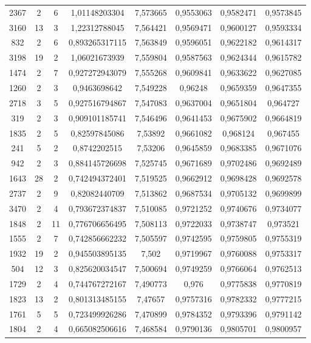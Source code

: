 \begin{longtable}{|c|c|c|c|c|c|c|c|}
2367 & 2 & 6 & 1,01148203304 & 7,573665 & 0,9553063 & 0,9582471 & 0,9573845 \\
3160 & 13 & 3 & 1,22312788045 & 7,564421 & 0,9569471 & 0,9600127 & 0,9593334 \\
832 & 2 & 6 & 0,893265317115 & 7,563849 & 0,9596051 & 0,9622182 & 0,9614317 \\
3198 & 19 & 2 & 1,06021673939 & 7,559804 & 0,9587563 & 0,9624344 & 0,9615782 \\
1474 & 2 & 7 & 0,927272943079 & 7,555268 & 0,9609841 & 0,9633622 & 0,9627085 \\
1260 & 2 & 3 & 0,9463698642 & 7,549228 & 0,96248 & 0,9659359 & 0,9647355 \\
2718 & 3 & 5 & 0,927516794867 & 7,547083 & 0,9637004 & 0,9651804 & 0,964727 \\
319 & 2 & 3 & 0,909101185741 & 7,546496 & 0,9641453 & 0,9675902 & 0,9664819 \\
1835 & 2 & 5 & 0,82597845086 & 7,53892 & 0,9661082 & 0,968124 & 0,967455 \\
241 & 5 & 2 & 0,8742202515 & 7,53206 & 0,9645859 & 0,9683385 & 0,9671076 \\
942 & 2 & 3 & 0,884145726698 & 7,525745 & 0,9671689 & 0,9702486 & 0,9692489 \\
1643 & 28 & 2 & 0,742494372401 & 7,519525 & 0,9662912 & 0,9698428 & 0,9692578 \\
2737 & 2 & 9 & 0,82082440709 & 7,513862 & 0,9687534 & 0,9705132 & 0,9699899 \\
3470 & 2 & 4 & 0,793672374837 & 7,510085 & 0,9721252 & 0,9740676 & 0,9734077 \\
1848 & 2 & 11 & 0,776706656495 & 7,508113 & 0,9722033 & 0,9738747 & 0,973521 \\
1555 & 2 & 7 & 0,742856662232 & 7,505597 & 0,9742595 & 0,9759805 & 0,9755319 \\
1932 & 19 & 2 & 0,945503895135 & 7,502 & 0,9719967 & 0,9760088 & 0,9753317 \\
504 & 12 & 3 & 0,825620034547 & 7,500694 & 0,9749259 & 0,9766064 & 0,9762513 \\
1729 & 2 & 4 & 0,744767272167 & 7,490773 & 0,976 & 0,9775838 & 0,9770819 \\
1823 & 13 & 2 & 0,801313485155 & 7,47657 & 0,9757316 & 0,9782332 & 0,9777215 \\
1761 & 5 & 5 & 0,723499926286 & 7,470899 & 0,9784352 & 0,9793396 & 0,9791142 \\
1804 & 2 & 4 & 0,665082506616 & 7,468584 & 0,9790136 & 0,9805701 & 0,9800957 \\

\end{longtable}
